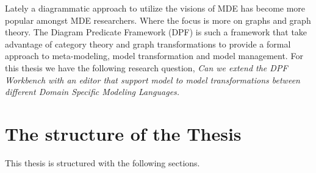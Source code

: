 Lately a diagrammatic approach to utilize the visions of MDE has become more
popular amongst MDE researchers. Where the focus is more on graphs and graph
theory. The Diagram Predicate Framework (DPF) is such a framework that take
advantage of category theory and graph transformations to provide a formal
approach to meta-modeling, model transformation and model management. For this
thesis we have the following research question, \textit{Can we extend the DPF
Workbench with an editor that support model to model transformations between
different Domain Specific Modeling Languages.}

% 
% 
% 



\section{The structure of the Thesis}

This thesis is structured with the following sections.

